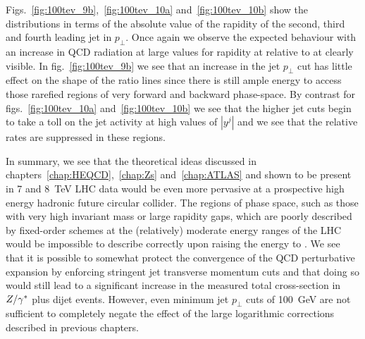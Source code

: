 	Figs.~\eqref{fig:100tev_9b},~\eqref{fig:100tev_10a} and~\eqref{fig:100tev_10b} show the distributions in terms of
	the absolute value of the rapidity of the second, third and fourth leading jet in $p_\perp$.  Once again we observe
	the expected behaviour with an increase in QCD radiation at large values for rapidity at \htev relative to at \stev
	clearly visible.  In fig.~\eqref{fig:100tev_9b} we see that an increase in the jet $p_\perp$ cut has little effect
	on the shape of the ratio lines since there is still ample energy to access those rarefied regions of very forward
	and backward phase-space.  By contrast for figs.~\eqref{fig:100tev_10a} and~\eqref{fig:100tev_10b} we see that the
	higher jet cuts begin to take a toll on the jet activity at high values of $|y^j|$ and we see that the relative
	rates are suppressed in these regions.

	In summary, we see that the theoretical ideas discussed in chapters~\ref{chap:HEQCD},~\ref{chap:Zs} and~\ref{chap:ATLAS}
	and shown to be present in 7 and 8~TeV LHC data would be even more pervasive at a prospective high energy hadronic
	future circular collider.  The regions of phase space, such as those with very high invariant mass or large rapidity
	gaps, which are poorly described by fixed-order schemes at the (relatively) moderate energy ranges
	of the LHC would be impossible to describe correctly upon raising the energy
	to \htev.  We see that it is possible to somewhat protect the convergence of the QCD perturbative expansion by enforcing
	stringent jet transverse momentum cuts and that doing so would still lead to a significant increase in the measured
	total cross-section in $Z/\gamma^*$ plus dijet events.  However, even minimum jet $p_\perp$ cuts of 100~GeV are not sufficient
	to completely negate the effect of the large logarithmic corrections described in previous chapters.

